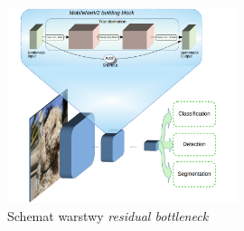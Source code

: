 \documentclass[
    left=2.5cm,         %
    right=2.5cm,        %
    top=2.5cm,          %
    bottom=3cm,         %
    bindingoffset=6mm,  %
    nohyphenation=false %
]{eiti/eiti-thesis}
\begin{document}
\begin{description}
            \begin{figure}[H]
            \begin{center}
            \caption{Schemat warstwy \textit{residual bottleneck}\cite{MobileNetV2_GoogleAI_Blogpost}}
            \includegraphics[width=0.6\textwidth]{eiti/mobilenetv2_overview.png}
            \end{center}
            \end{figure}
    \end{description}
\end{document}
